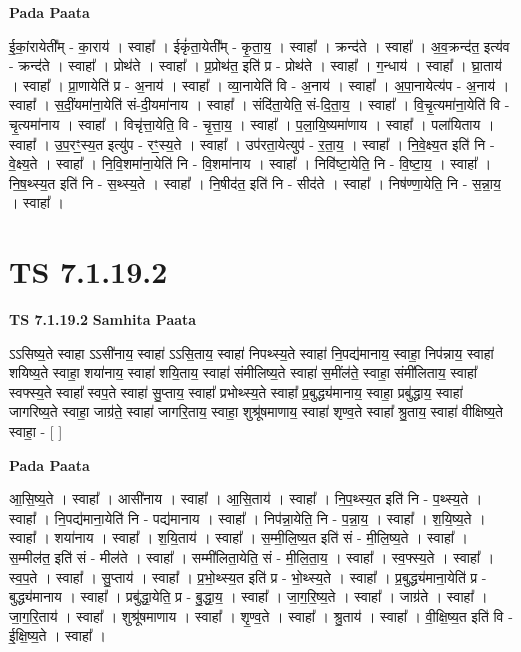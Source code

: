 \documentclass[17pt]{extarticle}
\begin{document}
\textbf{Pada Paata} \newline

ई॒कां॒रायेती᳚म् - का॒राय॑ । स्वाहा᳚ । ईकृं॑ता॒येती᳚म् - कृ॒ता॒य॒ । स्वाहा᳚ । क्रन्द॑ते । स्वाहा᳚ । अ॒व॒क्रन्द॑त॒ इत्य॑व - क्रन्द॑ते । स्वाहा᳚ । प्रोथ॑ते । स्वाहा᳚ । प्र॒प्रोथ॑त॒ इति॑ प्र - प्रोथ॑ते । स्वाहा᳚ । ग॒न्धाय॑ । स्वाहा᳚ । घ्रा॒ताय॑ । स्वाहा᳚ । प्रा॒णायेति॑ प्र - अ॒नाय॑ । स्वाहा᳚ । व्या॒नायेति॑ वि - अ॒नाय॑ । स्वाहा᳚ । अ॒पा॒नायेत्य॑प - अ॒नाय॑ । स्वाहा᳚ । स॒दीं॒यमा॑ना॒येति॑ सं-दी॒यमा॑नाय । स्वाहा᳚ । संदि॑ता॒येति॒ सं-दि॒ता॒य॒ । स्वाहा᳚ । वि॒चृ॒त्यमा॑ना॒येति॑ वि - चृ॒त्यमा॑नाय । स्वाहा᳚ । विचृ॑त्ता॒येति॒ वि - चृ॒त्ता॒य॒ । स्वाहा᳚ । प॒ला॒यि॒ष्यमा॑णाय । स्वाहा᳚ । पला॑यिताय । स्वाहा᳚ । उ॒प॒रꣳ॒॒स्य॒त इत्यु॑प - रꣳ॒॒स्य॒ते । स्वाहा᳚ । उप॑रता॒येत्युप॑ - र॒ता॒य॒ । स्वाहा᳚ । नि॒वे॒क्ष्य॒त इति॑ नि - वे॒क्ष्य॒ते । स्वाहा᳚ । नि॒वि॒शमा॑ना॒येति॑ नि - वि॒शमा॑नाय । स्वाहा᳚ । निवि॑ष्टा॒येति॒ नि - वि॒ष्टा॒य॒ । स्वाहा᳚ । नि॒ष॒थ्स्य॒त इति॑ नि - स॒थ्स्य॒ते । स्वाहा᳚ । नि॒षीद॑त॒ इति॑ नि - सीद॑ते । स्वाहा᳚ । निष॑ण्णा॒येति॒ नि - स॒न्ना॒य॒ । स्वाहा᳚ ।  \newline




\section*{ TS 7.1.19.2 }

\textbf{TS 7.1.19.2 } \newline
\textbf{Samhita Paata} \newline

ऽऽसिष्य॒ते स्वाहा ऽऽसी॑नाय॒ स्वाहा॑ ऽऽसि॒ताय॒ स्वाहा॑ निपथ्स्य॒ते स्वाहा॑ नि॒पद्य॑मानाय॒ स्वाहा॒ निप॑न्नाय॒ स्वाहा॑ शयिष्य॒ते स्वाहा॒ शया॑नाय॒ स्वाहा॑ शयि॒ताय॒ स्वाहा॑ संमीलिष्य॒ते स्वाहा॑ स॒मींल॑ते॒ स्वाहा॒ संमी॑लिताय॒ स्वाहा᳚ स्वफ्स्य॒ते स्वाहा᳚ स्वप॒ते स्वाहा॑ सु॒प्ताय॒ स्वाहा᳚ प्रभोथ्स्य॒ते स्वाहा᳚ प्र॒बुद्ध्य॑मानाय॒ स्वाहा॒ प्रबु॑द्धाय॒ स्वाहा॑ जागरिष्य॒ते स्वाहा॒ जाग्र॑ते॒ स्वाहा॑ जागरि॒ताय॒ स्वाहा॒ शुश्रू॑षमाणाय॒ स्वाहा॑ शृण्व॒ते स्वाहा᳚ श्रु॒ताय॒ स्वाहा॑ वीक्षिष्य॒ते स्वाहा॒ - [  ] \newline

\textbf{Pada Paata} \newline

आ॒सि॒ष्य॒ते । स्वाहा᳚ । आसी॑नाय । स्वाहा᳚ । आ॒सि॒ताय॑ । स्वाहा᳚ । नि॒प॒थ्स्य॒त इति॑ नि - प॒थ्स्य॒ते । स्वाहा᳚ । नि॒पद्य॑माना॒येति॑ नि - पद्य॑मानाय । स्वाहा᳚ । निप॑न्ना॒येति॒ नि - प॒न्ना॒य॒ । स्वाहा᳚ । श॒यि॒ष्य॒ते । स्वाहा᳚ । शया॑नाय । स्वाहा᳚ । श॒यि॒ताय॑ । स्वाहा᳚ । स॒म्मी॒लि॒ष्य॒त इति॑ सं - मी॒लि॒ष्य॒ते । स्वाहा᳚ । स॒म्मील॑त॒ इति॑ सं - मील॑ते । स्वाहा᳚ । सम्मी॑लिता॒येति॒ सं - मी॒लि॒ता॒य॒ । स्वाहा᳚ । स्व॒फ्स्य॒ते । स्वाहा᳚ । स्व॒प॒ते । स्वाहा᳚ । सु॒प्ताय॑ । स्वाहा᳚ । प्र॒भो॒थ्स्य॒त इति॑ प्र - भो॒थ्स्य॒ते । स्वाहा᳚ । प्र॒बुद्ध्य॑माना॒येति॑ प्र - बुद्ध्य॑मानाय । स्वाहा᳚ । प्रबु॑द्धा॒येति॒ प्र - बु॒द्धा॒य॒ । स्वाहा᳚ । जा॒ग॒रि॒ष्य॒ते । स्वाहा᳚ । जाग्र॑ते । स्वाहा᳚ । जा॒ग॒रि॒ताय॑ । स्वाहा᳚ । शुश्रू॑षमाणाय । स्वाहा᳚ । शृ॒ण्व॒ते । स्वाहा᳚ । श्रु॒ताय॑ । स्वाहा᳚ । वी॒क्षि॒ष्य॒त इति॑ वि - ई॒क्षि॒ष्य॒ते । स्वाहा᳚ ।  \newline
\end{document}
